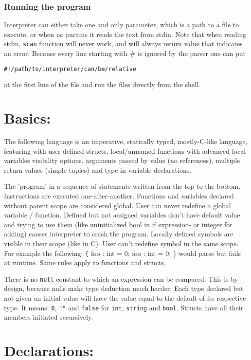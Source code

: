 \documentclass[11pt]{article}
\begin{document}
\subsubsection*{Running the program}
\label{sec:org795f447}
Interpreter can either take one and only parameter, which is a path to a
file to execute, or when no params it reads the text from stdin. Note that
when reading stdin, \texttt{scan} function will never work, and will always
return value that indicates an error. Because every line starting with \# is
ignored by the parser one can put
\begin{verbatim}
#!/path/to/interpreter/can/be/relative
\end{verbatim}
at the first line of the file and run the files directly from the shell.

\section*{Basics:}
\label{sec:org78c6b1c}
The following language is an imperative, statically typed, mostly-C-like
language, featuring with user-defined structs, local/unnamed functions with
advanced local variables visibility options, arguments passed by value (no
references), multiple return values (simple tuples) and type in variable
declarations.

The 'program' in a sequence of statements written from the top to the bottom.
Instructions are executed one-after-another.  Functions and variables declared
without parent scope are considered global.  User can never redefine a global
variable / function. Defined but not assigned variables don't have default
value and trying to use them (like uninitialized bool in if expression- or
integer for adding) causes interpreter to crash the program. Locally defined
symbols are visible in their scope (like in C). User can't redefine symbol in
the same scope. For example the following: \texttt\{ foo : int = 0; foo : int =
0; \} would parse but fails at runtime. Same rules apply to functions and
structs.

There is no \texttt{null} constant to which an expression can be
compared. This is by design, because nulls make type deduction much
harder. Each type declared but not given an initial value will have the value
equal to the default of its respective type. It means: \texttt{0}, \texttt{""}
and \texttt{false} for \texttt{int}, \texttt{string} and
\texttt{bool}. Structs have all their members initiated recursively.

\section*{Declarations:}
\label{sec:org7e58672}
\end{document}
